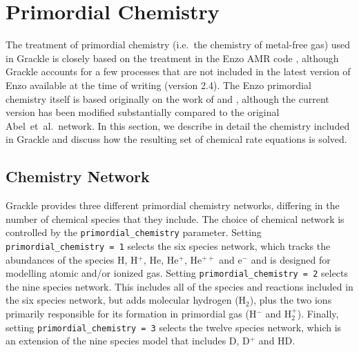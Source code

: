 


\section{Primordial Chemistry} \label{sec:primordial_chemistry}
The treatment of primordial chemistry (i.e.\ the chemistry of metal-free gas) used in Grackle is closely based on the
treatment in the Enzo AMR code \citep{2014ApJS..211...19B}, although Grackle accounts for a few processes that are not included 
in the latest version of Enzo available at the time of writing (version 2.4). The Enzo primordial chemistry itself is based 
originally on the work of \citet{1997NewA....2..181A} and \citet{1997NewA....2..209A}, although the current version has been
modified substantially compared to the original Abel~et~al.\ network. In this section, we describe in detail the chemistry 
included in Grackle and discuss how the resulting set of chemical rate equations is solved. 

\subsection{Chemistry Network} \label{sec:network}
Grackle provides three different primordial chemistry networks, differing in the number of chemical species that they include. 
The choice of chemical network is controlled by the \texttt{primordial\_chemistry} parameter. Setting \texttt{primordial\_chemistry = 1} selects the
six species network, which tracks the abundances of the species H, H$^{+}$, He, He$^{+}$, He$^{++}$ and e$^{-}$ and is 
designed for modelling atomic and/or ionized gas. Setting \texttt{primordial\_chemistry = 2} selects the nine species network. This
includes all of the species and reactions included in the six species network, but adds molecular hydrogen (H$_2$), plus the
two ions primarily responsible for its formation in primordial gas (H$^{-}$ and H$_{2}^{+}$). Finally, setting \texttt{primordial\_chemistry = 3}
selects the twelve species network, which is an extension of the nine species model that includes D, D$^{+}$ and HD.

